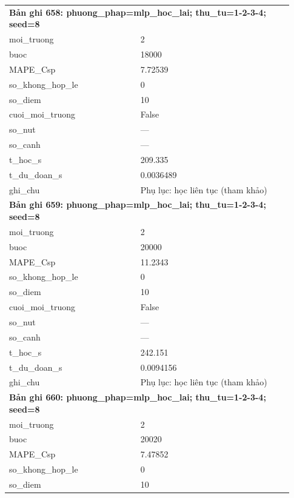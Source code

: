 \begin{longtable}{p{0.43\linewidth}p{0.50\linewidth}}
\midrule
\multicolumn{2}{p{0.95\linewidth}}{\textbf{Bản ghi 658: phuong\_phap=mlp\_hoc\_lai; thu\_tu=1-2-3-4; seed=8}} \\
moi\_\allowbreak truong & 2 \\
buoc & 18000 \\
MAPE\_\allowbreak Csp & 7.72539 \\
so\_\allowbreak khong\_\allowbreak hop\_\allowbreak le & 0 \\
so\_\allowbreak diem & 10 \\
cuoi\_\allowbreak moi\_\allowbreak truong & False \\
so\_\allowbreak nut & — \\
so\_\allowbreak canh & — \\
t\_\allowbreak hoc\_\allowbreak s & 209.335 \\
t\_\allowbreak du\_\allowbreak doan\_\allowbreak s & 0.0036489 \\
ghi\_\allowbreak chu & Phụ lục: học liên tục (tham khảo) \\
\midrule
\multicolumn{2}{p{0.95\linewidth}}{\textbf{Bản ghi 659: phuong\_phap=mlp\_hoc\_lai; thu\_tu=1-2-3-4; seed=8}} \\
moi\_\allowbreak truong & 2 \\
buoc & 20000 \\
MAPE\_\allowbreak Csp & 11.2343 \\
so\_\allowbreak khong\_\allowbreak hop\_\allowbreak le & 0 \\
so\_\allowbreak diem & 10 \\
cuoi\_\allowbreak moi\_\allowbreak truong & False \\
so\_\allowbreak nut & — \\
so\_\allowbreak canh & — \\
t\_\allowbreak hoc\_\allowbreak s & 242.151 \\
t\_\allowbreak du\_\allowbreak doan\_\allowbreak s & 0.0094156 \\
ghi\_\allowbreak chu & Phụ lục: học liên tục (tham khảo) \\
\midrule
\multicolumn{2}{p{0.95\linewidth}}{\textbf{Bản ghi 660: phuong\_phap=mlp\_hoc\_lai; thu\_tu=1-2-3-4; seed=8}} \\
moi\_\allowbreak truong & 2 \\
buoc & 20020 \\
MAPE\_\allowbreak Csp & 7.47852 \\
so\_\allowbreak khong\_\allowbreak hop\_\allowbreak le & 0 \\
so\_\allowbreak diem & 10 \\

\end{longtable}
